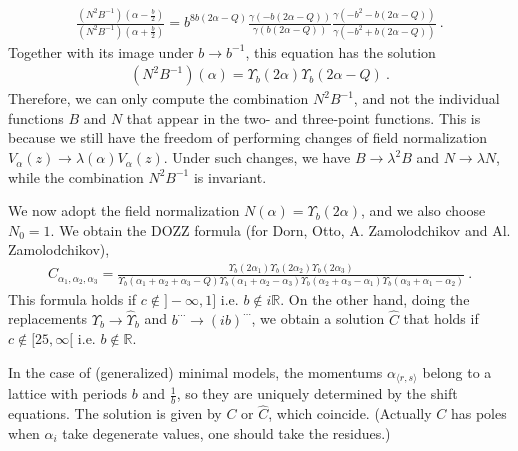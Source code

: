 \documentclass[12pt, a4paper]{article}
\theoremstyle{break}
\begin{document}
\begin{align}
 \frac{\left(N^2B^{-1}\right)(\alpha-\frac{b}{2})}{\left(N^2B^{-1}\right)(\alpha+\frac{b}{2})} = b^{8b(2\alpha-Q)} \frac{\gamma(-b(2\alpha-Q))}{\gamma(b(2\alpha-Q))} \frac{\gamma(-b^2-b(2\alpha-Q))}{\gamma(-b^2+b(2\alpha-Q))}\ .
\end{align}
Together with its image under $b\to b^{-1}$, this equation has the solution
\begin{align}
 \left(N^2B^{-1}\right)(\alpha) = \Upsilon_b(2\alpha)\Upsilon_b(2\alpha-Q)\ .
\end{align}
Therefore, we can only compute the combination $N^2B^{-1}$, and not the individual functions $B$ and $N$ that appear in the 
two- and three-point functions. This is because we still have the freedom of performing changes of field normalization $V_\alpha(z) \to \lambda(\alpha)V_\alpha(z)$. Under such changes, we have $B\to \lambda^2B$ and $N\to \lambda N$, while
the combination $N^2B^{-1}$ is invariant.

We now adopt the field normalization $N(\alpha)=\Upsilon_b(2\alpha)$, and we also choose $N_0=1$. 
We obtain the DOZZ formula (for Dorn, Otto, A.
Zamolodchikov and Al. Zamolodchikov),
\begin{align}
 C_{\alpha_1,\alpha_2,\alpha_3} =  \frac{\Upsilon_b(2\alpha_1) \Upsilon_b(2\alpha_2) \Upsilon_b(2\alpha_3)}{\Upsilon_b(\alpha_1+\alpha_2+\alpha_3-Q) \Upsilon_b(\alpha_1+\alpha_2-\alpha_3)\Upsilon_b(\alpha_2+\alpha_3-\alpha_1)\Upsilon_b(\alpha_3+\alpha_1-\alpha_2)} \ .
\label{caaa}
\end{align}
This formula holds if
$c\notin ]-\infty, 1]$ i.e. $b\notin i\mathbb{R}$. 
On the other hand, doing the replacements $\Upsilon_b\to \hat\Upsilon_b$ and $b^{\cdots} \to (ib)^{\cdots}$, we obtain a solution $\hat C$ that holds if  $c\notin [25,\infty[$ i.e. $b\notin \mathbb{R}$.

In the case of (generalized) minimal models, the momentums $\alpha_{\langle r,s\rangle}$ belong to a lattice with periods $b$ and $\frac{1}{b}$, so they are uniquely determined by the shift equations. The solution is given by $C$ or $\hat C$, which coincide. (Actually $C$ has poles when $\alpha_i$ take degenerate values, one should take the residues.)
\end{document}
